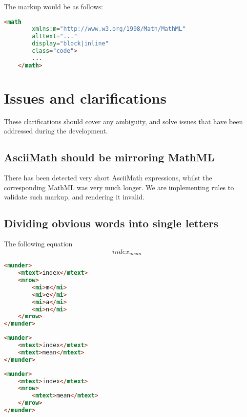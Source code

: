 \documentclass[english,a4paper,11pt]{article}
\begin{document}
\begin{examples}
The markup would be as follows:
\begin{lstlisting}[language=HTML]
	<math 
	    xmlns:m="http://www.w3.org/1998/Math/MathML"
	    alttext="..."
	    display="block|inline"
		class="code">
		...
	</math>
\end{lstlisting}
\end{examples}

\section{Issues and clarifications}

These clarifications should cover any ambiguity, and solve issues that have been addressed during the development.

\subsection{AsciiMath should be mirroring MathML}

There has been detected very short AsciiMath expressions, whilst the corresponding MathML was very much longer. We are implementing rules to validate such markup, and rendering it invalid.

\subsection{Dividing obvious words into single letters}
\begin{examples}
	The following equation
\begin{equation}
	index_{mean}
\end{equation}

\begin{lstlisting}[language=HTML, caption={\textbf{Invalid markup}}]
<munder>
	<mtext>index</mtext>
	<mrow>
		<mi>m</mi>
		<mi>e</mi>
		<mi>a</mi>
		<mi>n</mi>
	</mrow>
</munder>
\end{lstlisting}

\begin{lstlisting}[language=HTML, caption={Valid markup 1}]
<munder>
	<mtext>index</mtext>
	<mtext>mean</mtext>
</munder>
\end{lstlisting}

\begin{lstlisting}[language=HTML, caption={Valid markup 2}]
<munder>
	<mtext>index</mtext>
	<mrow>
		<mtext>mean</mtext>
	</mrow>
</munder>
\end{lstlisting}
\end{examples}
\end{document}
